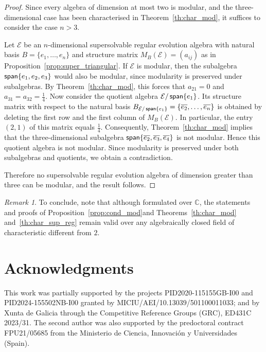 \documentclass[12pt,reqno]{amsart}
\theoremstyle{plain}%
\theoremstyle{definition}
\theoremstyle{remark}
\newtheorem{remark}[theorem]{Remark}
\newcommand{\E}{\mathcal{E}}
\DeclareMathOperator{\spa}{\textup{\textsf{span}}}
\numberwithin{equation}{section}
\begin{document}
\begin{proof}
Since every algebra of dimension at most two is modular, and the three-dimensional case has been characterised in Theorem~\ref{th:char_mod}, it suffices to consider the case $n>3$.
	
Let $\mathcal{E}$ be an $n$-dimensional supersolvable regular evolution algebra with natural basis $B=\{e_1,\dots,e_n\}$ and structure matrix $M_B(\mathcal{E})=(a_{ij})$ as in Proposition~\ref{prop:super_triangular}. If $\mathcal{E}$ is modular, then the subalgebra $\spa\{e_1,e_2,e_3\}$ would also be modular, since modularity is preserved under subalgebras. By Theorem~\ref{th:char_mod}, this forces that $a_{21}=0$ and $a_{31}=a_{32}=\frac{1}{4}$.
Now consider the quotient algebra $\mathcal{E}/\spa\{e_1\}$. Its structure matrix with respect to the natural basis $B_{\E/\spa\{e_1\}}=\{\overline{e_2},\dots,\overline{e_n}\}$ is obtained by deleting the first row and the first column of $M_B(\mathcal{E})$. In particular, the entry $(2,1)$ of this matrix equals $\tfrac14$. Consequently, Theorem~\ref{th:char_mod} implies that the three-dimensional subalgebra $\spa\{\overline{e_2},\overline{e_3},\overline{e_4}\}$ is not modular. Hence this quotient algebra is not modular.
Since modularity is preserved under both subalgebras and quotients, we obtain a contradiction. 

Therefore no supersolvable regular evolution algebra of dimension greater than three can be modular, and the result follows.
\end{proof}

\begin{remark}
To conclude, note that although formulated over $\mathbb{C}$, the statements and proofs of Proposition~\ref{prop:cond_mod}and Theorems~\ref{th:char_mod} and~\ref{th:char_sup_reg} remain valid over any algebraically closed field of characteristic different from $2$. 
\end{remark}



\section*{Acknowledgments}
This work was partially supported by the projects PID2020-115155GB-I00 and PID2024-155502NB-I00 granted by MICIU/AEI/10.13039/501100011033; 
and by Xunta de Galicia through the Competitive Reference Groups (GRC), ED431C
2023/31.
The second author was also supported by the predoctoral contract FPU21/05685 from the Ministerio de Ciencia, Innovación y Universidades (Spain).
\end{document}
